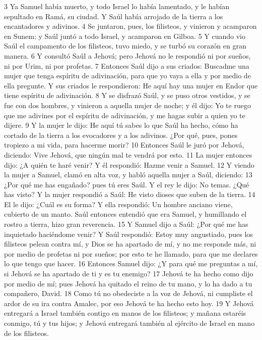 3 Ya Samuel había muerto, y todo Israel lo había lamentado, y le habían sepultado en Ramá, su ciudad. Y Saúl había arrojado de la tierra a los encantadores y adivinos. 
4 Se juntaron, pues, los filisteos, y vinieron y acamparon en Sunem; y Saúl juntó a todo Israel, y acamparon en Gilboa.
5 Y cuando vio Saúl el campamento de los filisteos, tuvo miedo, y se turbó su corazón en gran manera.
6 Y consultó Saúl a Jehová; pero Jehová no le respondió ni por sueños, ni por Urim, ni por profetas.
7 Entonces Saúl dijo a sus criados: Buscadme una mujer que tenga espíritu de adivinación, para que yo vaya a ella y por medio de ella pregunte. Y sus criados le respondieron: He aquí hay una mujer en Endor que tiene espíritu de adivinación.
8 Y se disfrazó Saúl, y se puso otros vestidos, y se fue con dos hombres, y vinieron a aquella mujer de noche; y él dijo: Yo te ruego que me adivines por el espíritu de adivinación, y me hagas subir a quien yo te dijere.
9 Y la mujer le dijo: He aquí tú sabes lo que Saúl ha hecho, cómo ha cortado de la tierra a los evocadores y a los adivinos. ¿Por qué, pues, pones tropiezo a mi vida, para hacerme morir?
10 Entonces Saúl le juró por Jehová, diciendo: Vive Jehová, que ningún mal te vendrá por esto.
11 La mujer entonces dijo: ¿A quién te haré venir? Y él respondió: Hazme venir a Samuel.
12 Y viendo la mujer a Samuel, clamó en alta voz, y habló aquella mujer a Saúl, diciendo: 
13 ¿Por qué me has engañado? pues tú eres Saúl. Y el rey le dijo: No temas. ¿Qué has visto? Y la mujer respondió a Saúl: He visto dioses que suben de la tierra.
14 El le dijo: ¿Cuál es su forma? Y ella respondió: Un hombre anciano viene, cubierto de un manto. Saúl entonces entendió que era Samuel, y humillando el rostro a tierra, hizo gran reverencia.
15 Y Samuel dijo a Saúl: ¿Por qué me has inquietado haciéndome venir? Y Saúl respondió: Estoy muy angustiado, pues los filisteos pelean contra mí, y Dios se ha apartado de mí, y no me responde más, ni por medio de profetas ni por sueños; por esto te he llamado, para que me declares lo que tengo que hacer.
16 Entonces Samuel dijo: ¿Y para qué me preguntas a mí, si Jehová se ha apartado de ti y es tu enemigo?
17 Jehová te ha hecho como dijo por medio de mí; pues Jehová ha quitado el reino de tu mano, y lo ha dado a tu compañero, David.
18 Como tú no obedeciste a la voz de Jehová, ni cumpliste el ardor de su ira contra Amalec, por eso Jehová te ha hecho esto hoy. 
19 Y Jehová entregará a Israel también contigo en manos de los filisteos; y mañana estaréis conmigo, tú y tus hijos; y Jehová entregará también al ejército de Israel en mano de los filisteos.
